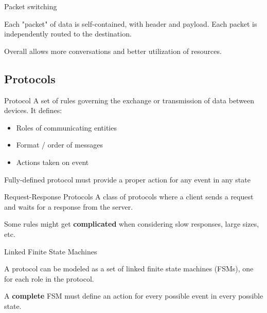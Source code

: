 \begin{definition}
    {Packet switching}

    Each "packet" of data is self-contained, with header and payload. Each packet is independently routed to the destination.

    Overall allows more conversations and better utilization of resources.
\end{definition}

\subsection{Protocols}

\begin{definition}
    {Protocol}
    A set of rules governing the exchange or transmission of data between devices. It defines:
    \begin{itemize}
        \item Roles of communicating entities
        \item Format / order of messages
        \item Actions taken on event
    \end{itemize}
    Fully-defined protocol must provide a proper action for any event in any state
\end{definition}

\begin{theorem}
    {Request-Response Protocols}
    A class of protocols where a client sends a request and waits for a response from the server.

    Some rules might get \textbf{complicated} when considering slow responses, large sizes, etc.
\end{theorem}

\begin{definition}
    {Linked Finite State Machines}

    A protocol can be modeled as a set of linked finite state machines (FSMs), one for each role in the protocol.

    A \textbf{complete} FSM must define an action for every possible event in every possible state.
\end{definition}

